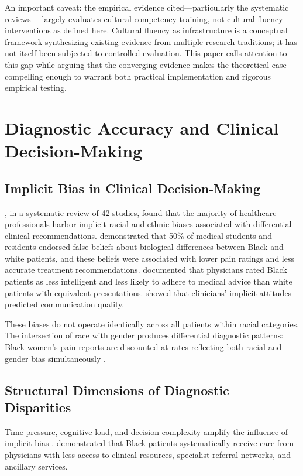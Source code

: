 \documentclass[12pt, a4paper]{article}
\begin{document}
An important caveat: the empirical evidence cited---particularly the systematic reviews \citep{beach2005, lie2011, truong2014}---largely evaluates cultural competency training, not cultural fluency interventions as defined here. Cultural fluency as infrastructure is a conceptual framework synthesizing existing evidence from multiple research traditions; it has not itself been subjected to controlled evaluation. This paper calls attention to this gap while arguing that the converging evidence makes the theoretical case compelling enough to warrant both practical implementation and rigorous empirical testing.

\section{Diagnostic Accuracy and Clinical Decision-Making}

\subsection{Implicit Bias in Clinical Decision-Making}

\citet{hall2015}, in a systematic review of 42 studies, found that the majority of healthcare professionals harbor implicit racial and ethnic biases associated with differential clinical recommendations. \citet{hoffman2016} demonstrated that 50\% of medical students and residents endorsed false beliefs about biological differences between Black and white patients, and these beliefs were associated with lower pain ratings and less accurate treatment recommendations. \citet{vanryn2000} documented that physicians rated Black patients as less intelligent and less likely to adhere to medical advice than white patients with equivalent presentations. \citet{cooper2006} showed that clinicians' implicit attitudes predicted communication quality.

These biases do not operate identically across all patients within racial categories. The intersection of race with gender produces differential diagnostic patterns: Black women's pain reports are discounted at rates reflecting both racial and gender bias simultaneously \citep{hoffman2016}.

\subsection{Structural Dimensions of Diagnostic Disparities}

Time pressure, cognitive load, and decision complexity amplify the influence of implicit bias \citep{penner2010}. \citet{bach2004} demonstrated that Black patients systematically receive care from physicians with less access to clinical resources, specialist referral networks, and ancillary services.
\end{document}
